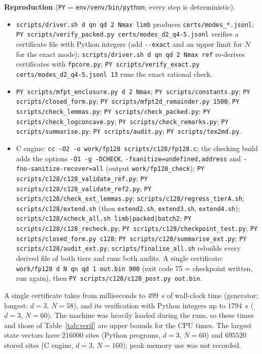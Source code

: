 \documentclass[11pt,a4paper]{article}
\theoremstyle{definition}
\theoremstyle{remark}
\begin{document}
\textbf{Reproduction} (\texttt{PY} = \texttt{env/venv/bin/python}; every step is deterministic).
\begin{itemize}
\item \texttt{scripts/driver.sh d qn qd 2 Nmax limb} produces \texttt{certs/modes\_*.jsonl}; \texttt{PY scripts/verify\_packed.py certs/modes\_d2\_q4-5.jsonl} verifies a certificate file with Python integers (add \texttt{-{}-exact} and an upper limit for $N$ for the exact mode); \texttt{scripts/driver.sh d qn qd 2 Nmax ref} re-derives certificates with \texttt{fpcore.py}; \texttt{PY scripts/verify\_exact.py certs/modes\_d2\_q4-5.jsonl 13} runs the exact rational check.
\item \texttt{PY scripts/mfpt\_enclosure.py d 2 Nmax}; \texttt{PY scripts/constants.py}; \texttt{PY scripts/closed\_form.py}; \texttt{PY scripts/mfpt2d\_remainder.py 1500}; \texttt{PY scripts/check\_lemmas.py}; \texttt{PY scripts/check\_packed.py}; \texttt{PY scripts/check\_logconcave.py}; \texttt{PY scripts/check\_remarks.py}; \texttt{PY scripts/summarise.py}; \texttt{PY scripts/audit.py}; \texttt{PY scripts/tex2md.py}.
\item C engine: \texttt{cc -O2 -o work/fp128 scripts/c128/fp128.c}; the checking build adds the options \texttt{-O1 -g -DCHECK}, \texttt{-fsanitize=undefined,address} and \texttt{-fno-sanitize-recover=all} (output \texttt{work/fp128\_check}); \texttt{PY scripts/c128/c128\_validate\_ref.py}; \texttt{PY scripts/c128/c128\_validate\_ref2.py}; \texttt{PY scripts/c128/check\_ext\_lemmas.py}; \texttt{scripts/c128/regress\_tierA.sh}; \texttt{scripts/c128/extend.sh} (then \texttt{extend2.sh}, \texttt{extend3.sh}, \texttt{extend4.sh}); \texttt{scripts/c128/xcheck\_all.sh limb|packed|batch2}; \texttt{PY scripts/c128/c128\_recheck.py}; \texttt{PY scripts/c128/checkpoint\_test.py}; \texttt{PY scripts/closed\_form.py c128}; \texttt{PY scripts/c128/summarise\_ext.py}; \texttt{PY scripts/c128/audit\_ext.py}; \texttt{scripts/finalise\_all.sh} rebuilds every derived file of both tiers and runs both audits. A single certificate: \texttt{work/fp128 d N qn qd 1 out.bin 900} (exit code 75 = checkpoint written, run again), then \texttt{PY scripts/c128/c128\_post.py out.bin}.
\end{itemize}
A single certificate takes from milliseconds to $499$~s of wall-clock time (generator; longest: $d=3$, $N=58$), and its verification with Python integers up to $1794$~s ($d=3$, $N=60$). The machine was heavily loaded during the runs, so these times and those of Table~\ref{tab:verif} are upper bounds for the CPU times. The largest state vectors have $216000$ sites (Python programs, $d=3$, $N=60$) and $695520$ stored sites (C engine, $d=3$, $N=160$); peak memory use was not recorded.
\end{document}
